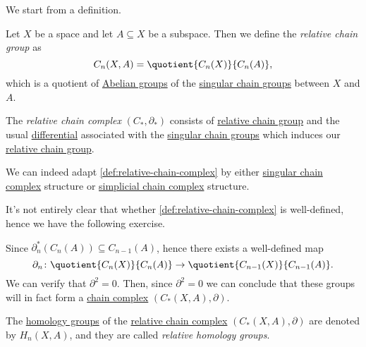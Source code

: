 We start from a definition.

\begin{definition}\label{def:relative-chain-group}
	Let \(X\) be a space and let \(A \subseteq X\) be a subspace. Then we define the \emph{relative chain group} as
	\[
		C_n(X, A) = \quotient{C_n(X)}{C_n(A)},
	\]
	which is a quotient of \hyperref[def:Abelian-group]{Abelian groups} of the \hyperref[def:singular-chain-group]{singular chain groups} between \(X\) and \(A\).
\end{definition}

\begin{definition}\label{def:relative-chain-complex}
	The \emph{relative chain complex} \((C_\ast, \partial_\ast )\) consists of \hyperref[def:relative-chain-group]{relative chain group} and the usual \hyperref[def:differential]{differential} associated with the \hyperref[def:singular-chain-group]{singular chain groups} which induces our \hyperref[def:relative-chain-group]{relative chain group}.
\end{definition}

\begin{remark}
	We can indeed adapt \autoref{def:relative-chain-complex} by either \hyperref[def:singular-chain-complex]{singular chain complex} structure or \hyperref[def:simplicial-complex]{simplicial chain complex} structure.
\end{remark}

It's not entirely clear that whether \autoref{def:relative-chain-complex} is well-defined, hence we have the following exercise.

\begin{exercise}
	Since \(\partial^\ast_n(C_{n} (A))\subseteq C_{n-1}(A) \), hence there exists a well-defined map
	\[
		\partial_n\colon \quotient{C_{n} (X)}{C_{n} (A)} \to \quotient{C_{n-1} (X)}{C_{n-1}(A)}.
	\]
	We can verify that \(\partial^{2} =0\). Then, since \(\partial^2 = 0\) we can conclude that these groups will in fact form a \hyperref[def:chain-complex]{chain complex} \((C_\ast(X, A), \partial)\).
\end{exercise}

\begin{definition}\label{def:relative-homology-group}
	The \hyperref[def:homology-group]{homology groups} of the \hyperref[def:relative-chain-complex]{relative chain complex} \((C_\ast(X, A), \partial)\) are denoted by \(H_n(X, A)\), and they are called \emph{relative homology groups}.
\end{definition}

